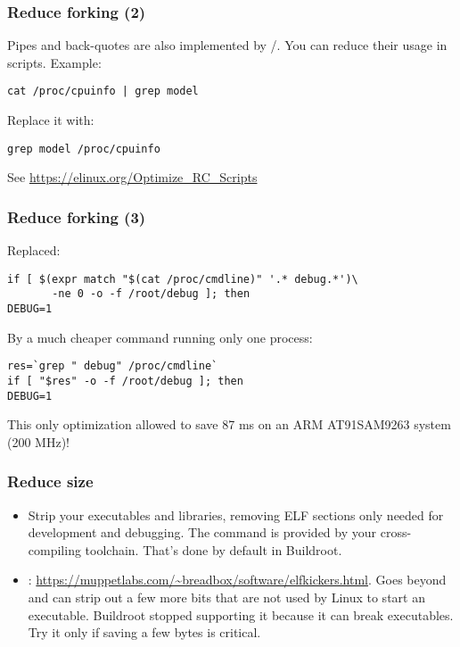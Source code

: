 \begin{frame}[fragile]
\frametitle{Reduce forking (2)}
Pipes and back-quotes are also implemented by
/.  You can reduce their usage in
scripts. Example:
\begin{block}{}
\begin{verbatim}
cat /proc/cpuinfo | grep model
\end{verbatim}
\end{block}
Replace it with:
\begin{block}{}
\begin{verbatim}
grep model /proc/cpuinfo
\end{verbatim}
\end{block}
See \url{https://elinux.org/Optimize_RC_Scripts}
\end{frame}

\begin{frame}[fragile]
\frametitle{Reduce forking (3)}
Replaced:
\begin{block}{}
\begin{verbatim}
if [ $(expr match "$(cat /proc/cmdline)" '.* debug.*')\
       -ne 0 -o -f /root/debug ]; then
DEBUG=1
\end{verbatim}
\end{block}
By a much cheaper command running only one process:
\begin{block}{}
\begin{verbatim}
res=`grep " debug" /proc/cmdline`
if [ "$res" -o -f /root/debug ]; then
DEBUG=1
\end{verbatim}
\end{block}
This only optimization allowed to save 87 ms on an ARM AT91SAM9263
system (200 MHz)!
\end{frame}


\begin{frame}
\frametitle{Reduce size}
\begin{itemize}
        \item Strip your executables and libraries, removing ELF sections
                only needed for development and debugging. The 
                command is provided by your cross-compiling toolchain.
                That's done by default in Buildroot.
        \item {}:
                \url{https://muppetlabs.com/~breadbox/software/elfkickers.html}.
                Goes beyond \code{strip} and can strip out a few more bits
                that are not used by Linux to start an executable.
                Buildroot stopped supporting it because it can break
                executables. Try it only if saving a few bytes is
                critical.
\end{itemize}
\end{frame}

